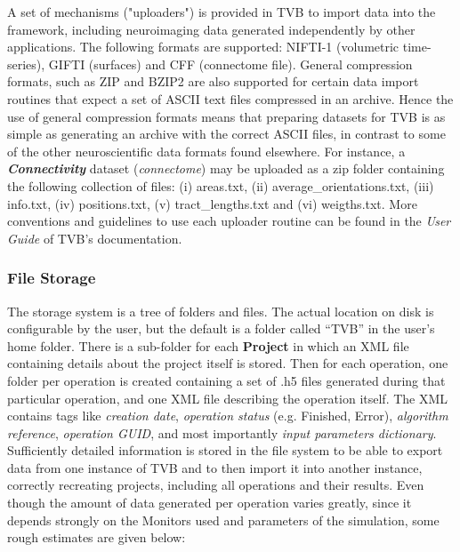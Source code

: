 \documentclass{bioinfo}
\newcommand*{\tvbdatatype}[1]{\textbf{\emph{#1}}}   %
\begin{document}
\begin{methods}
    A set of mechanisms ("uploaders") is provided in TVB to import data into the
    framework, including neuroimaging data generated independently by other
    applications. The following formats are supported: NIFTI-1 (volumetric time-
    series), GIFTI (surfaces) and CFF (connectome file). General compression formats,
    such as ZIP and BZIP2 are also supported for certain data import routines that
    expect a set of ASCII text files compressed in an archive. Hence the use of
    general compression formats means that preparing datasets for TVB is as simple
    as generating an archive with the correct ASCII files, in contrast to some of
    the other neuroscientific data formats found elsewhere. For instance, a
    \tvbdatatype{Connectivity} dataset (\emph{connectome}) may be uploaded as a zip
    folder containing the following collection of files: (i) areas.txt, (ii)
    average\_orientations.txt, (iii) info.txt, (iv) positions.txt, (v)
    tract\_lengths.txt and (vi) weigths.txt. More conventions     and guidelines to
    use each uploader routine can be found in the \emph{User Guide} of TVB's
    documentation.

    \subsubsection{File Storage}
    The storage system is a tree of folders and files. The actual location on
    disk is configurable by the user, but the default is a folder called
    ``TVB'' in the user's home folder. There is a sub-folder for each
    \textbf{Project}  in which an XML file containing details about the
    project itself is stored.  Then for each operation, one folder per
    operation is created containing a  set of .h5 files generated during that
    particular operation, and one XML  file describing the operation itself.
    The XML contains tags like   \emph{creation date}, \emph{operation status}
    (e.g. Finished, Error),  \emph{algorithm reference}, \emph{operation
    GUID}, and most importantly \emph{input parameters dictionary}.
    Sufficiently detailed information is stored in the file system to be able
    to export data from one instance of TVB and to then import it into another
    instance,  correctly recreating projects, including all operations and
    their results. 
    Even though the amount of data generated per operation varies greatly,
    since it depends strongly on the Monitors used and parameters of the 
    simulation, some rough estimates are given below:


\end{methods}
\end{document}
